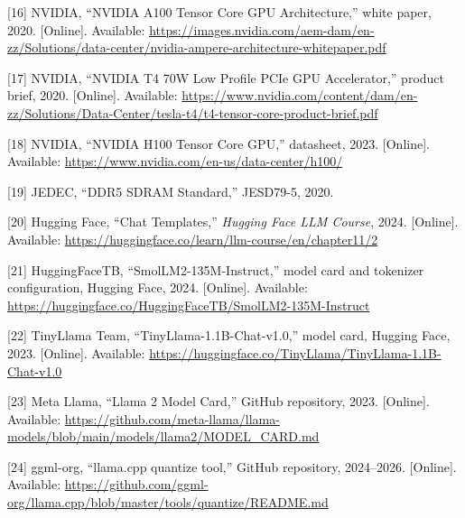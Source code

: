 \documentclass[conference]{IEEEtran}
\begin{document}
[16] NVIDIA, ``NVIDIA A100 Tensor Core GPU Architecture,'' white paper, 2020. [Online]. Available: \url{https://images.nvidia.com/aem-dam/en-zz/Solutions/data-center/nvidia-ampere-architecture-whitepaper.pdf}

[17] NVIDIA, ``NVIDIA T4 70W Low Profile PCIe GPU Accelerator,'' product brief, 2020. [Online]. Available: \url{https://www.nvidia.com/content/dam/en-zz/Solutions/Data-Center/tesla-t4/t4-tensor-core-product-brief.pdf}

[18] NVIDIA, ``NVIDIA H100 Tensor Core GPU,'' datasheet, 2023. [Online]. Available: \url{https://www.nvidia.com/en-us/data-center/h100/}

[19] JEDEC, ``DDR5 SDRAM Standard,'' JESD79-5, 2020.

[20] Hugging Face, ``Chat Templates,'' \emph{Hugging Face LLM Course}, 2024. [Online]. Available: \url{https://huggingface.co/learn/llm-course/en/chapter11/2}

[21] HuggingFaceTB, ``SmolLM2-135M-Instruct,'' model card and tokenizer configuration, Hugging Face, 2024. [Online]. Available: \url{https://huggingface.co/HuggingFaceTB/SmolLM2-135M-Instruct}

[22] TinyLlama Team, ``TinyLlama-1.1B-Chat-v1.0,'' model card, Hugging Face, 2023. [Online]. Available: \url{https://huggingface.co/TinyLlama/TinyLlama-1.1B-Chat-v1.0}

[23] Meta Llama, ``Llama 2 Model Card,'' GitHub repository, 2023. [Online]. Available: \url{https://github.com/meta-llama/llama-models/blob/main/models/llama2/MODEL_CARD.md}

[24] ggml-org, ``llama.cpp quantize tool,'' GitHub repository, 2024--2026. [Online]. Available: \url{https://github.com/ggml-org/llama.cpp/blob/master/tools/quantize/README.md}
\end{document}
